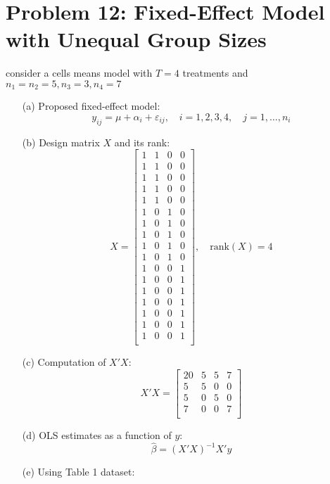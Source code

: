\documentclass[10pt, oneside]{article}
\begin{document}
\section*{Problem 12: Fixed-Effect Model with Unequal Group Sizes}
consider a cells means model with $T=4$ treatments and $n_1=n_2=5,n_3=3,n_4=7$
\begin{itemize}
	\item[(a)] Proposed fixed-effect model:
	      \[
		      y_{ij} = \mu + \alpha_i + \varepsilon_{ij}, \quad i = 1, 2, 3, 4,\quad j = 1, \dots, n_i
	      \]
	\item[(b)] Design matrix $X$ and its rank:
	      \[
		      X = \begin{bmatrix}
			      1 & 1 & 0 & 0 \\
			      1 & 1 & 0 & 0 \\
			      1 & 1 & 0 & 0 \\
			      1 & 1 & 0 & 0 \\
			      1 & 1 & 0 & 0 \\
			      1 & 0 & 1 & 0 \\
			      1 & 0 & 1 & 0 \\
			      1 & 0 & 1 & 0 \\
			      1 & 0 & 1 & 0 \\
			      1 & 0 & 1 & 0 \\
			      1 & 0 & 0 & 1 \\
			      1 & 0 & 0 & 1 \\
			      1 & 0 & 0 & 1 \\
			      1 & 0 & 0 & 1 \\
			      1 & 0 & 0 & 1 \\
			      1 & 0 & 0 & 1 \\
			      1 & 0 & 0 & 1 \\
		      \end{bmatrix}, \quad \text{rank}(X) = 4
	      \]
	\item[(c)] Computation of $X'X$:
	      \[
		      X'X =
		      \begin{bmatrix}
			      20 & 5 & 5 & 7 \\
			      5  & 5 & 0 & 0 \\
			      5  & 0 & 5 & 0 \\
			      7  & 0 & 0 & 7 \\
		      \end{bmatrix}
	      \]
	\item[(d)] OLS estimates as a function of $y$:
	      \[
		      \hat{\beta} = (X'X)^{-1} X'y
	      \]
	\item[(e)] Using Table 1 dataset:

\end{itemize}
\end{document}
